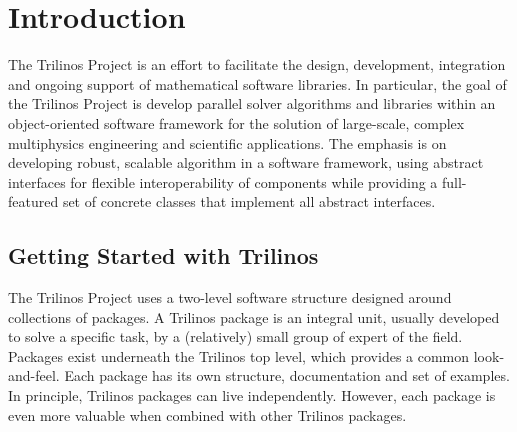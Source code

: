 % 
% 
% 
%   
%   
% 
% 

\chapter{Introduction}

The Trilinos Project is an effort to facilitate the design, development,
integration and ongoing support of mathematical software libraries. In
particular, the goal of the Trilinos Project is develop parallel solver
algorithms and libraries within an object-oriented software framework
for the solution of large-scale, complex multiphysics engineering and
scientific applications. The emphasis is on developing robust, scalable
algorithm in a software framework, using abstract interfaces for
flexible interoperability of components while providing a full-featured
set of concrete classes that implement all abstract interfaces.


\section{Getting Started with Trilinos}
\label{sec:getting}

The Trilinos Project uses a two-level software structure designed around
collections of packages. A Trilinos package is an integral unit, usually
developed to solve a specific task, by a (relatively) small group of
expert of the field.  Packages exist underneath the Trilinos top level,
which provides a common look-and-feel. Each package has its own
structure, documentation and set of examples. In principle, Trilinos
packages can live independently. However, each package is even more
valuable when combined with other Trilinos packages.

